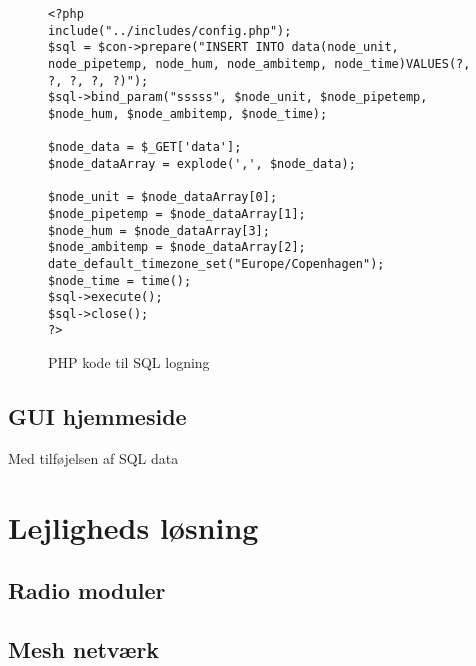 \begin{figure}[!ht]
	\begin{lstlisting}
<?php
include("../includes/config.php");
$sql = $con->prepare("INSERT INTO data(node_unit, node_pipetemp, node_hum, node_ambitemp, node_time)VALUES(?, ?, ?, ?, ?)");
$sql->bind_param("sssss", $node_unit, $node_pipetemp, $node_hum, $node_ambitemp, $node_time);

$node_data = $_GET['data'];
$node_dataArray = explode(',', $node_data);

$node_unit = $node_dataArray[0];
$node_pipetemp = $node_dataArray[1];
$node_hum = $node_dataArray[3];
$node_ambitemp = $node_dataArray[2];
date_default_timezone_set("Europe/Copenhagen"); 
$node_time = time(); 
$sql->execute();
$sql->close();
?>
\end{lstlisting}
\caption{PHP kode til SQL logning}
\label{phpsql}
\end{figure}


\subsection{GUI hjemmeside}
Med tilføjelsen af SQL data
\section{Lejligheds løsning}
\subsection{Radio moduler}
\subsection{Mesh netværk}
